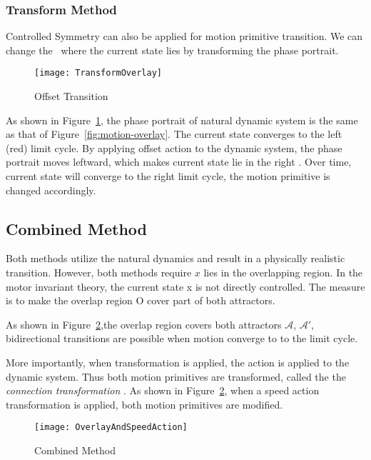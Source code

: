 \subsubsection*{Transform Method}
Controlled Symmetry can also be applied for motion primitive transition.
We can change the \boa\ where the current state lies by transforming the phase portrait.

\begin{figure}[!htbp]
  \begin{center}
      \texttt{[image: TransformOverlay]}
    \caption{Offset Transition}
    \label{fig:transform-offset}
  \end{center}
\end{figure}




As shown in Figure~\ref{fig:transform-offset}, the phase portrait of natural dynamic system is the same as that of Figure~\ref{fig:motion-overlay}.
The current state converges to the left (red) limit cycle.
By applying offset action to the dynamic system, the phase portrait  moves leftward, which makes current state lie in the right \boa.
Over time, current state will converge to the right limit cycle,  the motion primitive is changed accordingly.







\subsection{Combined Method}
Both methods utilize the natural dynamics and  result in a physically realistic transition.
However, both methods require $x$ lies in the overlapping region.
In the motor invariant theory, the current state x is not directly controlled. The measure is to make the overlap region O cover part of both attractors.

As shown in Figure~\ref{fig:Combine},the overlap region covers both attractors $\mathcal{A}$, $\mathcal{A'}$, bidirectional transitions are possible when motion converge to to the limit cycle.

More importantly, when transformation is applied, the action is applied to the dynamic system. Thus both motion primitives are transformed, called the the \emph{connection transformation }. 
As shown in Figure~\ref{fig:Combine}, when a speed action transformation is applied, both motion primitives are modified.

\begin{figure}[!htbp]
  \begin{center}
      \texttt{[image: OverlayAndSpeedAction]}
    \caption{Combined Method}
    \label{fig:Combine}
  \end{center}
\end{figure}

